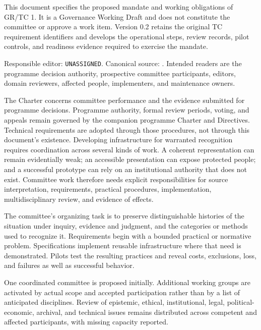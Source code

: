 \documentclass[11pt,a4paper]{article}
\begin{document}
\GSPfrontmatter
{}
This document specifies the proposed mandate and working obligations of GR/TC 1. It is a Governance Working Draft and does not constitute the committee or approve a work item. Version 0.2 retains the original TC requirement identifiers and develops the operational steps, review records, pilot controls, and readiness evidence required to exercise the mandate.

Responsible editor: \texttt{UNASSIGNED}. Canonical source: . Intended readers are the programme decision authority, prospective committee participants, editors, domain reviewers, affected people, implementers, and maintenance owners.

The Charter concerns committee performance and the evidence submitted for programme decisions. Programme authority, formal review periods, voting, and appeals remain governed by the companion programme Charter and Directives. Technical requirements are adopted through those procedures, not through this document's existence.
\tableofcontents
\clearpage
{}
Developing infrastructure for warranted recognition requires coordination across several kinds of work. A coherent representation can remain evidentially weak; an accessible presentation can expose protected people; and a successful prototype can rely on an institutional authority that does not exist. Committee work therefore needs explicit responsibilities for source interpretation, requirements, practical procedures, implementation, multidisciplinary review, and evidence of effects.

The committee's organizing task is to preserve distinguishable histories of the situation under inquiry, evidence and judgment, and the categories or methods used to recognize it. Requirements begin with a bounded practical or normative problem. Specifications implement reusable infrastructure where that need is demonstrated. Pilots test the resulting practices and reveal costs, exclusions, loss, and failures as well as successful behavior.

One coordinated committee is proposed initially. Additional working groups are activated by actual scope and accepted participation rather than by a list of anticipated disciplines. Review of epistemic, ethical, institutional, legal, political-economic, archival, and technical issues remains distributed across competent and affected participants, with missing capacity reported.
\end{document}
